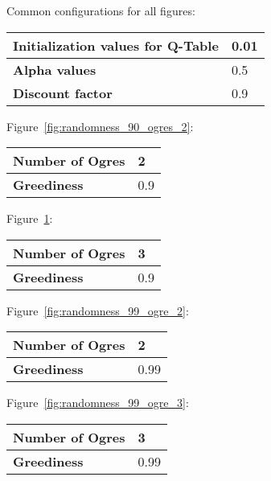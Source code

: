 \documentclass[a4paper,10pt]{scrartcl}
\begin{document}
\begin{figure}[htp]
\centering
\caption{}\label{fig:randomness_90_ogres_3}
\end{figure}

\begin{figure}[htp]
\centering
\caption{}\label{fig:randomness_99_3}
\end{figure}


Common configurations for all figures: 
\begin{center}
\begin{tabular}{|l|l|}
\hline
\textbf{Initialization values for Q-Table} & 0.01 \\
\hline
\textbf{Alpha values} & 0.5 \\
\hline
\textbf{Discount factor} & 0.9 \\
\hline
\end{tabular}
\end{center}

Figure~\ref{fig:randomness_90_ogres_2}:
\begin{center}
\begin{tabular}{|l|l|}
\hline
\textbf{Number of Ogres} & 2 \\
\hline
\textbf{Greediness} & 0.9 \\
\hline
\end{tabular}
\end{center}

Figure~\ref{fig:randomness_90_ogres_3}:
\begin{center}
\begin{tabular}{|l|l|}
\hline
\textbf{Number of Ogres} & 3 \\
\hline
\textbf{Greediness} & 0.9 \\
\hline
\end{tabular}
\end{center}

Figure~\ref{fig:randomness_99_ogre_2}:
\begin{center}
\begin{tabular}{|l|l|}
\hline
\textbf{Number of Ogres} & 2 \\
\hline
\textbf{Greediness} & 0.99 \\
\hline
\hline
\end{tabular}
\end{center}

Figure~\ref{fig:randomness_99_ogre_3}:
\begin{center}
\begin{tabular}{|l|l|}
\hline
\textbf{Number of Ogres} & 3 \\
\hline
\textbf{Greediness} & 0.99 \\
\hline
\end{tabular}
\end{center}
\end{document}
